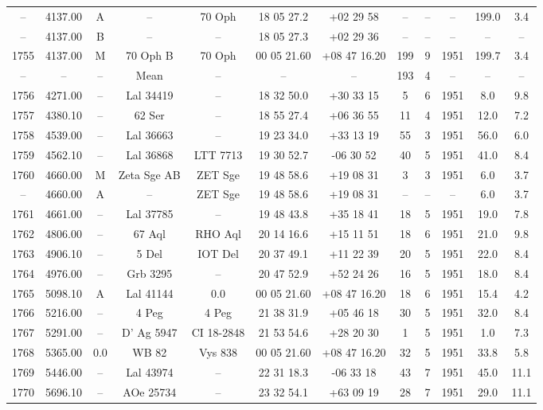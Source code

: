 \begin{table}
\begin{tabular}{cccccccccccc}
-- & 4137.00 & A & -- & 70 Oph & 18 05 27.2 & +02 29 58 & -- & -- & -- & 199.0 & 3.4 \\
-- & 4137.00 & B & -- & -- & 18 05 27.3 & +02 29 36 & -- & -- & -- & -- & -- \\
1755 & 4137.00 & M & 70 Oph B & 70 Oph & 00 05 21.60 & +08 47 16.20 & 199 & 9 & 1951 & 199.7 & 3.4 \\
-- & -- & -- & Mean & -- & -- & -- & 193 & 4 & -- & -- & -- \\
1756 & 4271.00 & -- & Lal 34419 & -- & 18 32 50.0 & +30 33 15 & 5 & 6 & 1951 & 8.0 & 9.8 \\
1757 & 4380.10 & -- & 62 Ser & -- & 18 55 27.4 & +06 36 55 & 11 & 4 & 1951 & 12.0 & 7.2 \\
1758 & 4539.00 & -- & Lal 36663 & -- & 19 23 34.0 & +33 13 19 & 55 & 3 & 1951 & 56.0 & 6.0 \\
1759 & 4562.10 & -- & Lal 36868 & LTT 7713 & 19 30 52.7 & -06 30 52 & 40 & 5 & 1951 & 41.0 & 8.4 \\
1760 & 4660.00 & M & Zeta Sge AB & ZET Sge & 19 48 58.6 & +19 08 31 & 3 & 3 & 1951 & 6.0 & 3.7 \\
-- & 4660.00 & A & -- & ZET Sge & 19 48 58.6 & +19 08 31 & -- & -- & -- & 6.0 & 3.7 \\
1761 & 4661.00 & -- & Lal 37785 & -- & 19 48 43.8 & +35 18 41 & 18 & 5 & 1951 & 19.0 & 7.8 \\
1762 & 4806.00 & -- & 67 Aql & RHO Aql & 20 14 16.6 & +15 11 51 & 18 & 6 & 1951 & 21.0 & 9.8 \\
1763 & 4906.10 & -- & 5 Del & IOT Del & 20 37 49.1 & +11 22 39 & 20 & 5 & 1951 & 22.0 & 8.4 \\
1764 & 4976.00 & -- & Grb 3295 & -- & 20 47 52.9 & +52 24 26 & 16 & 5 & 1951 & 18.0 & 8.4 \\
1765 & 5098.10 & A & Lal 41144 & 0.0 & 00 05 21.60 & +08 47 16.20 & 18 & 6 & 1951 & 15.4 & 4.2 \\
1766 & 5216.00 & -- & 4 Peg & 4 Peg & 21 38 31.9 & +05 46 18 & 30 & 5 & 1951 & 32.0 & 8.4 \\
1767 & 5291.00 & -- & D' Ag 5947 & CI 18-2848 & 21 53 54.6 & +28 20 30 & 1 & 5 & 1951 & 1.0 & 7.3 \\
1768 & 5365.00 & 0.0 & WB 82 & Vys 838 & 00 05 21.60 & +08 47 16.20 & 32 & 5 & 1951 & 33.8 & 5.8 \\
1769 & 5446.00 & -- & Lal 43974 & -- & 22 31 18.3 & -06 33 18 & 43 & 7 & 1951 & 45.0 & 11.1 \\
1770 & 5696.10 & -- & AOe 25734 & -- & 23 32 54.1 & +63 09 19 & 28 & 7 & 1951 & 29.0 & 11.1 \\

\end{tabular}
\end{table}
